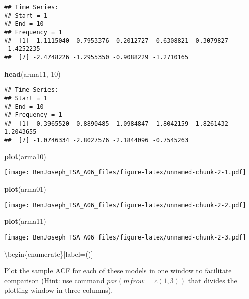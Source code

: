 \documentclass[
]{article}
\newenvironment{Shaded}{\begin{snugshade}}{\end{snugshade}}
\newcommand{\DecValTok}[1]{\textcolor[rgb]{0.00,0.00,0.81}{#1}}
\newcommand{\KeywordTok}[1]{\textcolor[rgb]{0.13,0.29,0.53}{\textbf{#1}}}
\newcommand{\NormalTok}[1]{#1}
\begin{document}
\begin{verbatim}
## Time Series:
## Start = 1 
## End = 10 
## Frequency = 1 
##  [1]  1.1115040  0.7953376  0.2012727  0.6308821  0.3079827 -1.4252235
##  [7] -2.4748226 -1.2955350 -0.9088229 -1.2710165
\end{verbatim}

\begin{Shaded}
\begin{Highlighting}[]
\KeywordTok{head}\NormalTok{(arma11, }\DecValTok{10}\NormalTok{)}
\end{Highlighting}
\end{Shaded}

\begin{verbatim}
## Time Series:
## Start = 1 
## End = 10 
## Frequency = 1 
##  [1]  0.3965520  0.8890485  1.0984847  1.8042159  1.8261432  1.2043655
##  [7] -1.0746334 -2.8027576 -2.1844096 -0.7545263
\end{verbatim}

\begin{Shaded}
\begin{Highlighting}[]
\KeywordTok{plot}\NormalTok{(arma10)}
\end{Highlighting}
\end{Shaded}

\texttt{[image: BenJoseph\_TSA\_A06\_files/figure-latex/unnamed-chunk-2-1.pdf]}

\begin{Shaded}
\begin{Highlighting}[]
\KeywordTok{plot}\NormalTok{(arma01)}
\end{Highlighting}
\end{Shaded}

\texttt{[image: BenJoseph\_TSA\_A06\_files/figure-latex/unnamed-chunk-2-2.pdf]}

\begin{Shaded}
\begin{Highlighting}[]
\KeywordTok{plot}\NormalTok{(arma11)}
\end{Highlighting}
\end{Shaded}

\texttt{[image: BenJoseph\_TSA\_A06\_files/figure-latex/unnamed-chunk-2-3.pdf]}

\textbackslash begin\{enumerate\}{[}label=(\alph*){]}

\item

Plot the sample ACF for each of these models in one window to facilitate
comparison (Hint: use command \(par(mfrow=c(1,3))\) that divides the
plotting window in three columns).
\end{document}
